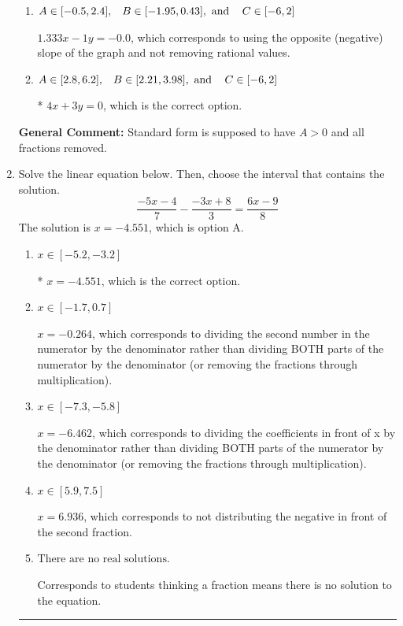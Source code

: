 \documentclass{extbook}[14pt]
\newcommand{\litem}[1]{\item #1

\rule{\textwidth}{0.4pt}}
\begin{document}
\begin{enumerate}
{\begin{enumerate}[label=\Alph*.]
 $4x - 3y = 0$, which corresponds to using the opposite (negative) slope of the graph, but did everything else correctly.
\item \( A \in [-0.5, 2.4], \hspace{3mm} B \in [-1.95, 0.43], \text{ and } \hspace{3mm} C \in [-6, 2] \)

 $1.333x - 1y = -0.0$, which corresponds to using the opposite (negative) slope of the graph and not removing rational values.
\item \( A \in [2.8, 6.2], \hspace{3mm} B \in [2.21, 3.98], \text{ and } \hspace{3mm} C \in [-6, 2] \)

* $4x + 3y = 0$, which is the correct option.
\end{enumerate}

\textbf{General Comment:} Standard form is supposed to have $A > 0$ and all fractions removed.
}
\litem{
Solve the linear equation below. Then, choose the interval that contains the solution.
\[ \frac{-5x -4}{7} - \frac{-3x + 8}{3} = \frac{6x -9}{8} \]The solution is \( x = -4.551 \), which is option A.\begin{enumerate}[label=\Alph*.]
\item \( x \in [-5.2, -3.2] \)

* $x = -4.551$, which is the correct option.
\item \( x \in [-1.7, 0.7] \)

 $x = -0.264$, which corresponds to dividing the second number in the numerator by the denominator rather than dividing BOTH parts of the numerator by the denominator (or removing the fractions through multiplication).
\item \( x \in [-7.3, -5.8] \)

 $x = -6.462$, which corresponds to dividing the coefficients in front of x by the denominator rather than dividing BOTH parts of the numerator by the denominator (or removing the fractions through multiplication).
\item \( x \in [5.9, 7.5] \)

 $x = 6.936$, which corresponds to not distributing the negative in front of the second fraction.
\item \( \text{There are no real solutions.} \)

Corresponds to students thinking a fraction means there is no solution to the equation.
\end{enumerate}

}
\end{enumerate}
\end{document}
